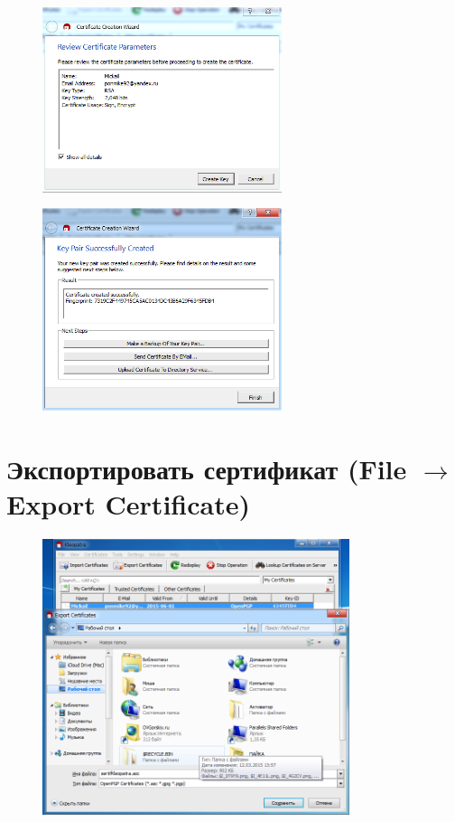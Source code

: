 \documentclass[utf8x, 12pt]{G7-32}
\begin{document}
\begin{figure}[hhh!]
	\begin{center}
		\includegraphics[width=7cm, height=6cm]{img/1_1}
		\includegraphics[width=7cm, height=6cm]{img/1_2}
	\end{center}
\end{figure}	

\section{Экспортировать сертификат (File $\rightarrow$ Export Certificate)}
\begin{figure}[hhh!]
	\begin{center}
		\includegraphics[width=9cm]{img/2_1}
	\end{center}
\end{figure}	
\end{document}
